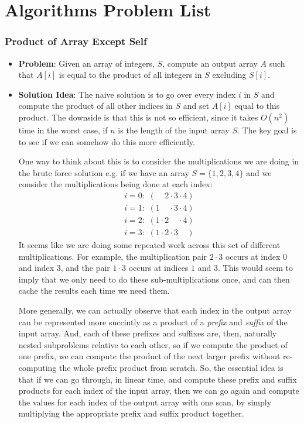 \documentclass[10pt,a4paper]{article}
\begin{document}
\section*{Algorithms Problem List}

\subsubsection*{Product of Array Except Self}

\begin{itemize}
    \item \textbf{Problem}: Given an array of integers, $S$, compute an output array $A$ such that $A[i]$ is equal to the product of all integers in $S$ excluding $S[i]$.
    \item \textbf{Solution Idea}: The naive solution is to go over every index $i$ in $S$ and compute the product of all other indices in $S$ and set $A[i]$ equal to this product. The downside is that this is not so efficient, since it takes $O(n^2)$ time in the worst case, if $n$ is the length of the input array $S$. The key goal is to see if we can somehow do this more efficiently. 
    
    One way to think about this is to consider the multiplications we are doing in the brute force solution e.g. if we have an array $S=\{1,2,3,4\}$ and we consider the multiplications being done at each index:
    \begin{align*}
        i=0 : \, \, (\phantom{1 \cdot} 2 \cdot 3 \cdot 4) \\ 
        i=1 : \, \, (1 \phantom{1 \cdot} \cdot 3 \cdot 4) \\
        i=2 : \, \, (1 \cdot 2 \phantom{1 \cdot} \cdot 4) \\
        i=3 : \, \, (1 \cdot 2 \cdot 3 \phantom{1 \cdot})
    \end{align*}
    It seems like we are doing some repeated work across this set of different multiplications. For example, the multiplication pair $2 \cdot 3$ occurs at index $0$ and index $3$, and the pair $1 \cdot 3$ occurs at indices $1$ and $3$. This would seem to imply that we only need to do these sub-multiplications once, and can then cache the results each time we need them. 
    
    More generally, we can actually observe that each index in the output array can be represented more succintly as a product of a \textit{prefix} and \textit{suffix} of the input array. And, each of these prefixes and suffixes are, then, naturally nested subproblems relative to each other, so if we compute the product of one prefix, we can compute the product of the next larger prefix without re-computing the whole prefix product from scratch. So, the essential idea is that if we can go through, in linear time, and compute these prefix and suffix products for each index of the input array, then we can go again and compute the values for each index of the output array with one scan, by simply multiplying the appropriate prefix and suffix product together.


\end{itemize}
\end{document}
